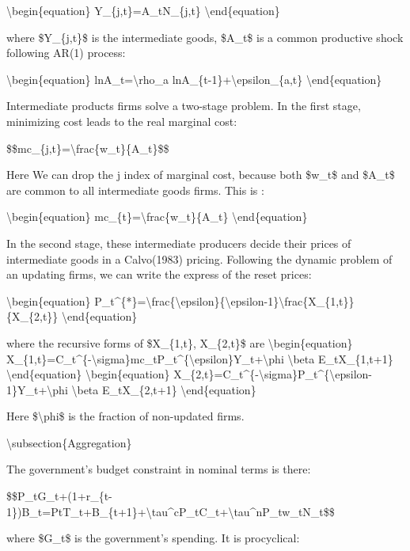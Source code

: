 \documentclass[10pt,math=newtx,citestyle=gb7714-2015,bibstyle=gb7714-2015]{elegantbook}
\begin{document}
	\textbackslash{}begin\{equation\}
	Y\_\{j,t\}=A\_tN\_\{j,t\}
	\textbackslash{}end\{equation\}
	
	where \$Y\_\{j,t\}\$ is the intermediate goods, \$A\_t\$ is a common productive shock following AR(1) process:
	
	\textbackslash{}begin\{equation\}
	lnA\_t=\textbackslash{}rho\_a lnA\_\{t-1\}+\textbackslash{}epsilon\_\{a,t\}
	\textbackslash{}end\{equation\}
	
	Intermediate products firms solve a two-stage problem. In the first stage, minimizing cost leads to the real marginal cost:
	
	\$\$mc\_\{j,t\}=\textbackslash{}frac\{w\_t\}\{A\_t\}\$\$
	
	Here We can drop the j index of marginal cost, because both \$w\_t\$ and \$A\_t\$ are common to all intermediate goods firms. This is :
	
	\textbackslash{}begin\{equation\}
	mc\_\{t\}=\textbackslash{}frac\{w\_t\}\{A\_t\}
	\textbackslash{}end\{equation\}
	
	In the second stage, these intermediate producers decide their prices of intermediate goods in a Calvo(1983) pricing. Following the dynamic problem of an updating firms, we can write the express of the reset prices:
	
	\textbackslash{}begin\{equation\}
	P\_t\^{}\{*\}=\textbackslash{}frac\{\textbackslash{}epsilon\}\{\textbackslash{}epsilon-1\}\textbackslash{}frac\{X\_\{1,t\}\}\{X\_\{2,t\}\}
	\textbackslash{}end\{equation\}
	
	where the recursive forms of \$X\_\{1,t\}, X\_\{2,t\}\$ are
	\textbackslash{}begin\{equation\}
	X\_\{1,t\}=C\_t\^{}\{-\textbackslash{}sigma\}mc\_tP\_t\^{}\{\textbackslash{}epsilon\}Y\_t+\textbackslash{}phi \textbackslash{}beta E\_tX\_\{1,t+1\}
	\textbackslash{}end\{equation\}
	\textbackslash{}begin\{equation\}
	X\_\{2,t\}=C\_t\^{}\{-\textbackslash{}sigma\}P\_t\^{}\{\textbackslash{}epsilon-1\}Y\_t+\textbackslash{}phi \textbackslash{}beta E\_tX\_\{2,t+1\}
	\textbackslash{}end\{equation\}
	
	Here \$\textbackslash{}phi\$ is the fraction of non-updated firms.
	
	\textbackslash{}subsection\{Aggregation\}
	
	The government's budget constraint in nominal terms is there:
	
	\$\$P\_tG\_t+(1+r\_\{t-1\})B\_t=PtT\_t+B\_\{t+1\}+\textbackslash{}tau\^{}cP\_tC\_t+\textbackslash{}tau\^{}nP\_tw\_tN\_t\$\$
	
	where \$G\_t\$ is the government's spending. It is procyclical:
	
\end{document}
